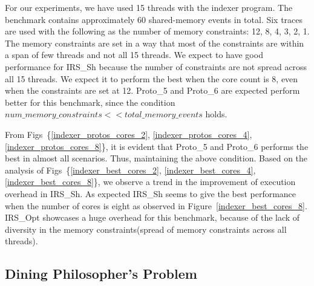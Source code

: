 For our experiments, we have used 15 threads with the indexer program. 
The benchmark contains approximately 60 shared-memory events in total. 
Six traces are used with the following as the number of memory constraints: 12, 8, 4, 3, 2, 1. 
The memory constraints are set in a way that most of the constraints are within a span of few threads and not all 15 threads. 
We expect to have good performance for IRS\_Sh because the number of constraints are not spread across all 15 threads. 
We expect it to perform the best when the core count is 8, even when the constraints are set at 12. 
Proto\_5 and Proto\_6 are expected perform better for this benchmark, since the condition $num\_memory\_constraints << total\_memory\_events$ holds. 

From Figs~\{\ref{indexer_protos_cores_2}, \ref{indexer_protos_cores_4}, \ref{indexer_protos_cores_8}\}, it is evident that Proto\_5 and Proto\_6 performs the best in almost all scenarios. 
Thus, maintaining the above condition. 
Based on the analysis of Figs~\{\ref{indexer_best_cores_2}, \ref{indexer_best_cores_4}, \ref{indexer_best_cores_8}\}, we observe a trend in the improvement of execution overhead in IRS\_Sh. 
As expected IRS\_Sh seems to give the best performance when the number of cores is eight as observed in Figure~\ref{indexer_best_cores_8}.
IRS\_Opt showcases a huge overhead for this benchmark, because of the lack of diversity in the memory constraints(spread of memory constraints across all threads). 


\subsection{Dining Philosopher's Problem}

